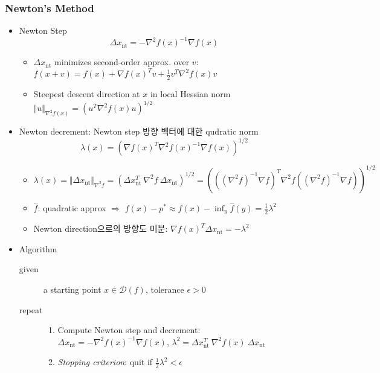 \subsubsection*{Newton's Method}
\begin{itemize}
    \item Newton Step
    \begin{equation}
        \Delta x_\mathrm{nt}=-\nabla^2f(x)^{-1}\nabla f(x)
    \end{equation}
    \begin{itemize}
        \item $\Delta x_\mathrm{nt}$ minimizes second-order approx. over $v$: $f(x+v)=f(x)+\nabla f(x)^Tv+\frac{1}{2}v^T\nabla^2f(x)v$
        \item Steepest descent direction at $x$ in local Hessian norm $\Vert u\Vert_{\nabla^2 f(x)}=\left(u^T\nabla^2 f(x)u\right)^{1/2}$
    \end{itemize}
    \item Newton decrement: Newton step 방향 벡터에 대한 qudratic norm
    \begin{equation}
        \lambda(x) = \left(\nabla f(x)^T\nabla^2f(x)^{-1}\nabla f(x)\right)^{1/2}
    \end{equation}
    \begin{itemize}
        \item $\lambda(x)=\Vert\Delta x_\mathrm{nt}\Vert_{\nabla^2f}=(\Delta x_\mathrm{nt}^T~\nabla^2f~\Delta x_\mathrm{nt})^{1/2}=\left(((\nabla^2 f)^{-1}\nabla f)^T\nabla^2 f((\nabla^2 f)^{-1}\nabla f)\right)^{1/2}$
        \item $\hat{f}$: quadratic approx $\Rightarrow$ $f(x)-p^\ast\approx f(x)-\inf_y\hat{f}(y)=\frac{1}{2}\lambda^2$
        \item Newton direction으로의 방향도 미분: $\nabla f(x)^T\Delta x_\mathrm{nt}=-\lambda^2$
    \end{itemize}
    \item Algorithm
    \begin{description}
        \item[given] a starting point $x\in\mathcal{D}(f)$, tolerance $\epsilon>0$
        \item[repeat] \phantom{}
        \begin{enumerate}
            \item Compute Newton step and decrement: $\Delta x_\mathrm{nt}=-\nabla^2f(x)^{-1}\nabla f(x)$, $\lambda^2=\Delta x_\mathrm{nt}^T~\nabla^2f(x)~\Delta x_\mathrm{nt}$
            \item \textit{Stopping criterion}: quit if $\frac{1}{2}\lambda^2<\epsilon$

\end{enumerate}
\end{description}
\end{itemize}
